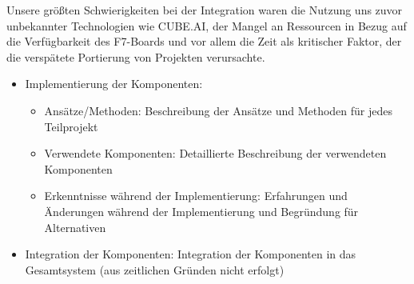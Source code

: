 Unsere größten Schwierigkeiten bei der Integration waren die Nutzung uns zuvor unbekannter Technologien wie CUBE.AI, der Mangel an Ressourcen in Bezug auf die Verfügbarkeit des F7-Boards und vor allem die Zeit als kritischer Faktor, der die verspätete Portierung von Projekten verursachte.

\begin{itemize}

	\item Implementierung der Komponenten:
	\begin{itemize}
		\item Ansätze/Methoden: Beschreibung der Ansätze und Methoden für jedes Teilprojekt
		\item Verwendete Komponenten: Detaillierte Beschreibung der verwendeten Komponenten
		\item Erkenntnisse während der Implementierung: Erfahrungen und Änderungen während der Implementierung und Begründung für Alternativen
	\end{itemize}
	\item Integration der Komponenten: Integration der Komponenten in das Gesamtsystem (aus zeitlichen Gründen nicht erfolgt)
\end{itemize}


